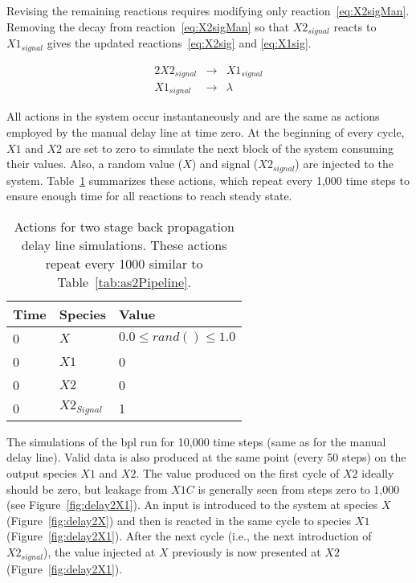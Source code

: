 Revising the remaining reactions requires modifying only reaction~\ref{eq:X2sigMan}. Removing the decay from reaction~\ref{eq:X2sigMan} so that $X2_{signal}$ reacts to $X1_{signal}$ gives the updated reactions~\ref{eq:X2sig} and \ref{eq:X1sig}.

\begin{alignat}{2}
X2_{signal} & \rightarrow & X1_{signal} \label{eq:X2sig} \\
X1_{signal} & \rightarrow & \lambda \label{eq:X1sig}
\end{alignat}

All actions in the system occur instantaneously and are the same as actions employed by the manual delay line at time zero. At the beginning of every cycle, $X1$ and $X2$ are set to zero to simulate the next block of the system consuming their values. Also, a random value ($X$) and signal ($X2_{signal}$) are injected to the system. Table~\ref{tab:as2} summarizes these actions, which repeat every 1,000 time steps to ensure enough time for all reactions to reach steady state.

\begin{table}
	\caption[Two Stage Backwards Propagation Delay Line]{Actions for two stage back propagation delay line simulations. These actions repeat every 1000 similar to Table~\ref{tab:as2Pipeline}.}
	\label{tab:as2}
	\centering
	\begin{tabular}{lll}
		Time		& Species			& Value 					\\ \hline
		0			& $X$				& $0.0 \le rand() \le 1.0$	\\
		0			& $X1$				& 0							\\
		0			& $X2$				& 0							\\
		0			& $X2_{Signal}$ 	& 1							\\
	\end{tabular}
\end{table}

The simulations of the \gls{bpl} run for 10,000 time steps (same as for the manual delay line). Valid data is also produced at the same point (every 50 steps) on the output species $X1$ and $X2$. The value produced on the first cycle of $X2$ ideally should be zero, but leakage from $X1C$ is generally seen from steps zero to 1,000 (see Figure~\ref{fig:delay2X1}). An input is introduced to the system at species $X$ (Figure~\ref{fig:delay2X}) and then is reacted in the same cycle to species $X1$ (Figure~\ref{fig:delay2X1}). After the next cycle (i.e., the next introduction of $X2_{signal}$), the value injected at $X$ previously is now presented at $X2$ (Figure~\ref{fig:delay2X1}).

